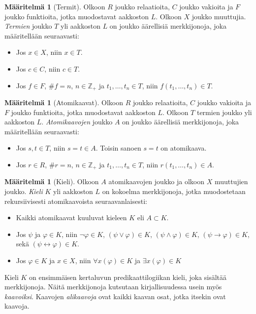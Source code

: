 \documentclass[finnish]{tktltiki2}
\theoremstyle{definition}
\newtheorem{maar}[lau]{Määritelmä}
\theoremstyle{remark}
\begin{document}
\begin{maar}[Termit]
Olkoon $R$ joukko relaatioita, $C$ joukko vakioita ja $F$ joukko funktioita, jotka muodostavat aakkoston $L$. Olkoon $X$ joukko muuttujia. \textit{Termien} joukko $T$ yli aakkoston $L$ on joukko äärellisiä merkkijonoja, joka määritellään seuraavasti:
\begin{itemize}
\item Jos $x \in X$, niin $x \in T$.
\item Jos $c \in C$, niin $c \in T$.
\item Jos $f \in F$, $\#f = n$, $n\in \mathbb{Z}_+$ ja $t_1, \ldots, t_n \in T$, niin $f(t_1, \ldots, t_n) \in T$.
\end{itemize}
\end{maar}

\begin{maar}[Atomikaavat]
Olkoon $R$ joukko relaatioita, $C$ joukko vakioita ja $F$ joukko funktioita, jotka muodostavat aakkoston $L$. Olkoon $T$ termien joukko yli aakkoston $L$. \textit{Atomikaavojen} joukko $A$ on joukko äärellisiä merkkijonoja, joka määritellään seuraavasti:
\begin{itemize}
\item Jos $s, t \in T$, niin $s = t \in A$. Toisin sanoen $s = t$ on atomikaava.
\item Jos $r \in R$, $\#r = n$, $n\in \mathbb{Z}_+$ ja $t_1, \ldots, t_n \in T$, niin $r(t_1, \ldots, t_n) \in A$.
\end{itemize}
\end{maar}

\begin{maar}[Kieli]
Olkoon $A$ atomikaavojen joukko ja olkoon $X$ muuttujien joukko. \textit{Kieli} $K$ yli aakkoston $L$ on kokoelma merkkijonoja, jotka muodostetaan rekursiivisesti atomikaavoista seuraavanlaisesti:
\begin{itemize}
\item Kaikki atomikaavat kuuluvat kieleen $K$ eli $A \subset K$.
\item Jos $\psi$ ja $\varphi \in K$, niin $\neg \varphi \in K$, $(\psi \lor \varphi) \in K$, $(\psi \land \varphi) \in K$, $(\psi \to \varphi) \in K$, sekä $(\psi \leftrightarrow \varphi) \in K$.
\item Jos $\varphi \in K$ ja $x \in X$, niin $\forall x(\varphi) \in K$ ja $\exists x(\varphi) \in K$
\end{itemize}
\end{maar}
Kieli $K$ on ensimmäisen kertaluvun predikaattilogiikan kieli, joka sisältää merkkijonoja. Näitä merkkijonoja kutsutaan kirjallisuudessa usein myös \textit{kaavoiksi}. Kaavojen \textit{alikaavoja} ovat kaikki kaavan osat, jotka itsekin ovat kaavoja. 
\end{document}
